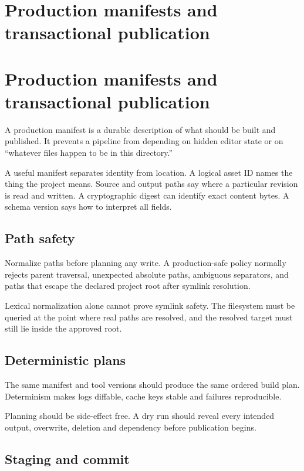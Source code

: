 \hypertarget{appendix-91eaa3cbdbc3}{}
\section*{Production manifests and transactional publication}
\section{Production manifests and transactional publication}\label{production-manifests-and-transactional-publication}

A production manifest is a durable description of what should be built and published. It prevents a pipeline from depending on hidden editor state or on ``whatever files happen to be in this directory.''

A useful manifest separates identity from location. A logical asset ID names the thing the project means. Source and output paths say where a particular revision is read and written. A cryptographic digest can identify exact content bytes. A schema version says how to interpret all fields.

\subsection{Path safety}\label{path-safety}

Normalize paths before planning any write. A production-safe policy normally rejects parent traversal, unexpected absolute paths, ambiguous separators, and paths that escape the declared project root after symlink resolution.

Lexical normalization alone cannot prove symlink safety. The filesystem must be queried at the point where real paths are resolved, and the resolved target must still lie inside the approved root.

\subsection{Deterministic plans}\label{deterministic-plans}

The same manifest and tool versions should produce the same ordered build plan. Determinism makes logs diffable, cache keys stable and failures reproducible.

Planning should be side-effect free. A dry run should reveal every intended output, overwrite, deletion and dependency before publication begins.

\subsection{Staging and commit}\label{staging-and-commit}

